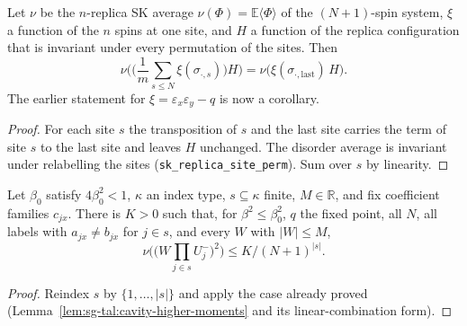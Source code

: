 \begin{lemma}
\label{lem:sg-tal:site-mean}
\leanok
{}
Let $\nu$ be the $n$-replica SK average $\nu(\Phi)=\mathbb E\langle\Phi\rangle$ of the
$(N+1)$-spin system, $\xi$ a function of the $n$ spins at one site, and $H$ a function of the
replica configuration that is invariant under every permutation of the sites. Then
\[
 \nu\Big(\Big(\frac1m\sum_{s\le N}\xi(\sigma_{\cdot,s})\Big)H\Big)
 =\nu\big(\xi(\sigma_{\cdot,\mathrm{last}})\,H\big).
\]
The earlier statement for $\xi=\varepsilon_x\varepsilon_y-q$ is now a corollary.
\end{lemma}
\begin{proof}
\leanok
For each site $s$ the transposition of $s$ and the last site carries the term of site $s$
to the last site and leaves $H$ unchanged. The disorder average is invariant under
relabelling the sites (\texttt{sk\_replica\_site\_perm}). Sum over $s$ by linearity.
\end{proof}

\begin{lemma}
\label{lem:sg-tal:lincomb-sq-finset}
\leanok
{}
Let $\beta_0$ satisfy $4\beta_0^2<1$, $\kappa$ an index type, $s\subseteq\kappa$ finite, $M\in\mathbb R$,
and fix coefficient families $c_{jx}$. There is $K>0$ such that, for $\beta^2\le\beta_0^2$,
$q$ the fixed point, all $N$, all labels with $a_{jx}\neq b_{jx}$ for $j\in s$,
and every $W$ with $|W|\le M$,
\[
 \nu\Big(\big(W\prod_{j\in s}U^-_j\big)^2\Big)\le K/(N+1)^{|s|}.
\]
\end{lemma}
\begin{proof}
\leanok
Reindex $s$ by $\{1,\dots,|s|\}$ and apply the case already proved
(Lemma~\ref{lem:sg-tal:cavity-higher-moments} and its linear-combination form).
\end{proof}

